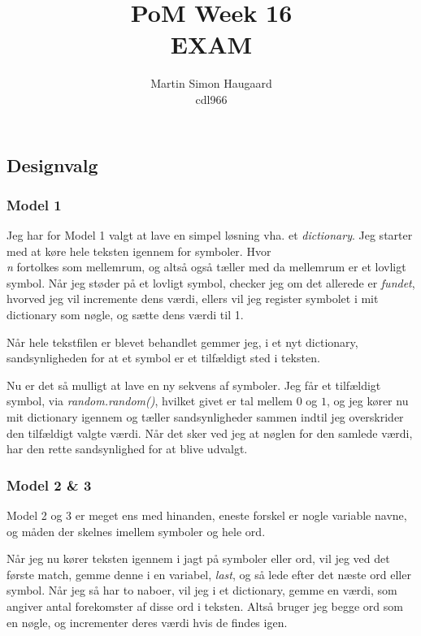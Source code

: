 \documentclass[11pt]{article} %
\title{PoM Week 16\\EXAM}
\author{Martin Simon Haugaard\\cdl966}
\begin{document}
\maketitle

\section*{}

\subsection*{Designvalg}
\subsubsection*{Model 1}
Jeg har for Model 1 valgt at lave en simpel løsning vha. et \textit{dictionary}. Jeg starter med at køre hele teksten igennem for symboler. Hvor \textit{\\n} fortolkes som mellemrum, og altså også tæller med da mellemrum er et lovligt symbol.
Når jeg støder på et lovligt symbol, checker jeg om det allerede er \textit{fundet}, hvorved jeg vil incremente dens værdi, ellers vil jeg register symbolet i mit dictionary som nøgle, og sætte dens værdi til 1.

Når hele tekstfilen er blevet behandlet gemmer jeg, i et nyt dictionary, sandsynligheden for at et symbol er et tilfældigt sted i teksten.

Nu er det så mulligt at lave en ny sekvens af symboler. Jeg får et tilfældigt symbol, via \textit{random.random()}, hvilket givet er tal mellem $0$ og $1$, og jeg kører nu mit dictionary igennem og tæller sandsynligheder sammen indtil jeg overskrider den tilfældigt valgte værdi. Når det sker ved jeg at nøglen for den samlede værdi, har den rette sandsynlighed for at blive udvalgt.

\subsubsection*{Model 2 \& 3}
Model 2 og 3 er meget ens med hinanden, eneste forskel er nogle variable navne, og måden der skelnes imellem symboler og hele ord.

Når jeg nu kører teksten igennem i jagt på symboler eller ord, vil jeg ved det første match, gemme denne i en variabel, \textit{last}, og så lede efter det næste ord eller symbol. Når jeg så har to naboer, vil jeg i et dictionary, gemme en værdi, som angiver antal forekomster af disse ord i teksten. Altså bruger jeg begge ord som en nøgle, og incrementer deres værdi hvis de findes igen.\\
\end{document}
